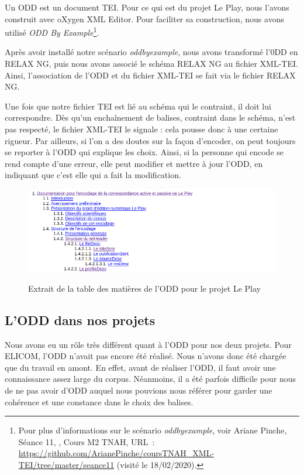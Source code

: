 Un ODD est un document TEI. Pour ce qui est du projet Le Play, nous l'avons construit avec oXygen XML Editor. Pour faciliter sa construction, nous avons utilisé \emph{ODD By Example}\footnote{Pour plus d'informations sur le scénario \emph{oddbyexample}, voir Ariane Pinche, Séance 11, , Cours M2 TNAH, URL~: \url{https://github.com/ArianePinche/coursTNAH_XML-TEI/tree/master/seance11} (visité le 18/02/2020).}.

Après avoir installé notre scénario \emph{oddbyexample}, nous avons transformé l'0DD en RELAX NG, puis nous avons associé le schéma RELAX NG au fichier XML-TEI. Ainsi, l'association de l'ODD et du fichier XML-TEI se fait via le fichier RELAX NG. 

Une fois que notre fichier TEI est lié au schéma qui le contraint, il doit lui correspondre. Dès qu'un enchaînement de balises, contraint dans le schéma, n'est pas respecté, le fichier XML-TEI le signale : cela pousse donc à une certaine rigueur. Par ailleurs, si l'on a des doutes sur la façon d'encoder, on peut toujours se reporter à l'ODD qui explique les choix. Ainsi, si la personne qui encode se rend compte d'une erreur, elle peut modifier et mettre à jour l'ODD, en indiquant que c'est elle qui a fait la modification. 

\begin{figure}[ht]
    \centering
    \caption{Extrait de la table des matières de l'ODD pour le projet Le Play}
    \includegraphics[width=16cm]{images/tableMatiereODD.png}
    \label{tableMatiereODD}
\end{figure}

\subsection{L'ODD dans nos projets}

Nous avons eu un rôle très différent quant à l'ODD pour nos deux projets. Pour ELICOM, l'ODD n'avait pas encore été réalisé. Nous n'avons donc été chargée que du travail en amont. En effet, avant de réaliser l'ODD, il faut avoir une connaissance assez large du corpus. Néanmoins, il a été parfois difficile pour nous de ne pas avoir d'ODD auquel nous pouvions nous référer pour garder une cohérence et une constance dans le choix des balises.

